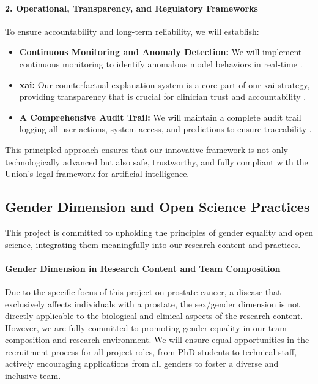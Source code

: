 \documentclass[11pt, a4paper]{article}
\begin{document}
\begin{itemize}
\paragraph{2. Operational, Transparency, and Regulatory Frameworks}
To ensure accountability and long-term reliability, we will establish:
\begin{itemize}
    \item \textbf{Continuous Monitoring and Anomaly Detection:} We will implement continuous monitoring to identify anomalous model behaviors in real-time \cite{AlAttar2023,GarcaGmezBlanesSelva2023}.
    \item \textbf{\gls{xai}:} Our counterfactual explanation system is a core part of our \gls{xai} strategy, providing transparency that is crucial for clinician trust and accountability \cite{GarcaGmezBlanesSelva2023,JamesIjiga2024}.
    \item \textbf{A Comprehensive Audit Trail:} We will maintain a complete audit trail logging all user actions, system access, and predictions to ensure traceability \cite{GarcaGmezBlanesSelva2023,KhadkaEpiphaniou2025}.
\end{itemize}
\end{itemize}

This principled approach ensures that our innovative framework is not only technologically advanced but also safe, trustworthy, and fully compliant with the Union's legal framework for artificial intelligence.

\subsection{Gender Dimension and Open Science Practices}
This project is committed to upholding the principles of gender equality and open science, integrating them meaningfully into our research content and practices.

\paragraph{Gender Dimension in Research Content and Team Composition}
Due to the specific focus of this project on prostate cancer, a disease that exclusively affects individuals with a prostate, the sex/gender dimension is not directly applicable to the biological and clinical aspects of the research content. However, we are fully committed to promoting gender equality in our team composition and research environment. We will ensure equal opportunities in the recruitment process for all project roles, from PhD students to technical staff, actively encouraging applications from all genders to foster a diverse and inclusive team.
\end{document}
